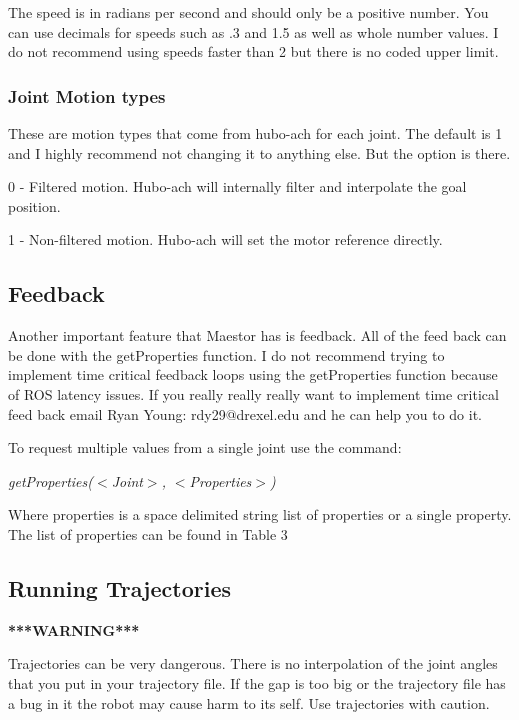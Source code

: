 \documentclass[12pt]{article}
\begin{document}
The speed is in radians per second and should only be a positive number. You can use decimals for speeds such as .3 and 1.5 as well as whole number values. I do not recommend using speeds faster than 2 but there is no coded upper limit. 


\subsubsection{Joint Motion types}

These are motion types that come from hubo-ach for each joint. The default is 1 and I highly recommend not changing it to anything else. But the option is there.  

0 - Filtered motion. Hubo-ach will internally filter and interpolate the goal position.

1 - Non-filtered motion. Hubo-ach will set the motor reference directly.

	
\subsection{Feedback}

Another important feature that Maestor has is feedback. All of the feed back can be done with the getProperties function. I do not recommend trying to implement time critical feedback loops using the getProperties function because of ROS latency issues. If you really really really want to implement time critical feed back email Ryan Young: rdy29@drexel.edu and he can help you to do it.  

To request multiple values from a single joint use the command:
    \begin{center}
		\textit{getProperties($<$Joint$>$, $<$Properties$>$)}
	\end{center}

Where properties is a space delimited string list of properties or a single property. The list of properties can be found in Table 3


\subsection{Running Trajectories}

\begin{center}
\textbf{***WARNING***}
\end{center}
Trajectories can be very dangerous. There is no interpolation of the joint angles that you put in your trajectory file. If the gap is too big or the trajectory file has a bug in it the robot may cause harm to its self. Use trajectories with caution.\\
\end{document}
